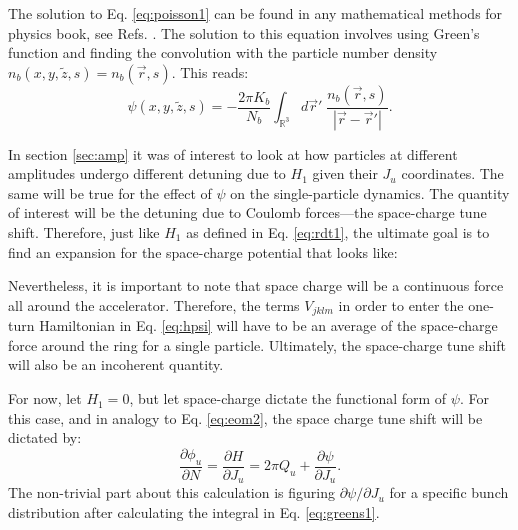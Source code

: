 The solution to Eq. \ref{eq:poisson1} can be found in any mathematical methods for physics book, see Refs. \cite{arfken,tellez}. The solution to this equation involves using Green's function and finding the convolution with the particle number density $n_b(x,y,\tilde{z},s)=n_b(\vec{r},s)$. This reads:
\begin{equation}
    \label{eq:greens1}
    \psi(x,y,\tilde{z},s)=-\frac{2 \pi K_b}{N_b} \int_{\mathbb{R}^3} d\vec{r}' \; \frac{n_b(\vec{r},s)}{\left| \vec{r}-\vec{r}' \right|}.
\end{equation} 
 
In section \ref{sec:amp} it was of interest to look at how particles at different amplitudes undergo different detuning due to $H_1$ given their $J_u$ coordinates. The same will be true for the effect of $\psi$ on the single-particle dynamics. The quantity of interest will be the detuning due to Coulomb forces---the space-charge tune shift. Therefore, just like $H_1$ as defined in Eq. \ref{eq:rdt1}, the ultimate goal is to find an expansion for the space-charge potential that looks like:

Nevertheless, it is important to note that space charge will be a continuous force all around the accelerator. Therefore, the terms $V_{jklm}$ in order to enter the one-turn Hamiltonian in Eq. \ref{eq:hpsi} will have to be an average of the space-charge force around the ring for a single particle. Ultimately, the space-charge tune shift will also be an incoherent quantity.

For now, let $H_1=0$, but let space-charge dictate the functional form of $\psi$. For this case, and in analogy to Eq. \ref{eq:eom2}, the space charge tune shift will be dictated by:
\begin{equation}
    \label{eq:eompsi}
    \frac{\partial \phi_u}{\partial N} = \frac{\partial H}{\partial J_u} = 2\pi Q_u + \frac{\partial \psi}{\partial J_u}.
\end{equation}
The non-trivial part about this calculation is figuring ${\partial \psi}/{\partial J_u}$ for a specific bunch distribution after calculating the integral in Eq. \ref{eq:greens1}.

